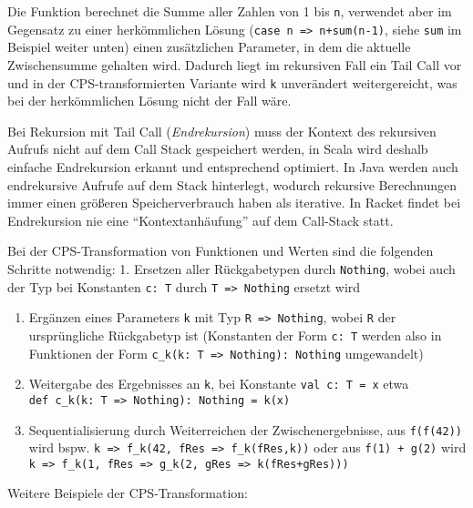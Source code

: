 \documentclass[]{article}
\begin{document}
Die Funktion berechnet die Summe aller Zahlen von 1 bis \texttt{n},
verwendet aber im Gegensatz zu einer herkömmlichen Lösung
(\texttt{case\ n\ =\textgreater{}\ n+sum(n-1)}, siehe \texttt{sum} im
Beispiel weiter unten) einen zusätzlichen Parameter, in dem die aktuelle
Zwischensumme gehalten wird. Dadurch liegt im rekursiven Fall ein Tail
Call vor und in der CPS-transformierten Variante wird \texttt{k}
unverändert weitergereicht, was bei der herkömmlichen Lösung nicht der
Fall wäre.

Bei Rekursion mit Tail Call (\emph{Endrekursion}) muss der Kontext des
rekursiven Aufrufs nicht auf dem Call Stack gespeichert werden, in Scala
wird deshalb einfache Endrekursion erkannt und entsprechend optimiert.
In Java werden auch endrekursive Aufrufe auf dem Stack hinterlegt,
wodurch rekursive Berechnungen immer einen größeren Speicherverbrauch
haben als iterative. In Racket findet bei Endrekursion nie eine
``Kontextanhäufung'' auf dem Call-Stack statt.

Bei der CPS-Transformation von Funktionen und Werten sind die folgenden
Schritte notwendig: 1. Ersetzen aller Rückgabetypen durch
\texttt{Nothing}, wobei auch der Typ bei Konstanten \texttt{c:\ T} durch
\texttt{T\ =\textgreater{}\ Nothing} ersetzt wird

\begin{enumerate}
\def\labelenumi{\arabic{enumi}.}
\setcounter{enumi}{1}
\item
  Ergänzen eines Parameters \texttt{k} mit Typ
  \texttt{R\ =\textgreater{}\ Nothing}, wobei \texttt{R} der
  ursprüngliche Rückgabetyp ist (Konstanten der Form \texttt{c:\ T}
  werden also in Funktionen der Form
  \texttt{c\_k(k:\ T\ =\textgreater{}\ Nothing):\ Nothing} umgewandelt)
\item
  Weitergabe des Ergebnisses an \texttt{k}, bei Konstante
  \texttt{val\ c:\ T\ =\ x} etwa
  \texttt{def\ c\_k(k:\ T\ =\textgreater{}\ Nothing):\ Nothing\ =\ k(x)}
\item
  Sequentialisierung durch Weiterreichen der Zwischenergebnisse, aus
  \texttt{f(f(42))} wird bspw.
  \texttt{k\ =\textgreater{}\ f\_k(42,\ fRes\ =\textgreater{}\ f\_k(fRes,k))}
  oder aus \texttt{f(1)\ +\ g(2)} wird
  \texttt{k\ =\textgreater{}\ f\_k(1,\ fRes\ =\textgreater{}\ g\_k(2,\ gRes\ =\textgreater{}\ k(fRes+gRes)))}
\end{enumerate}

Weitere Beispiele der CPS-Transformation:
\end{document}
